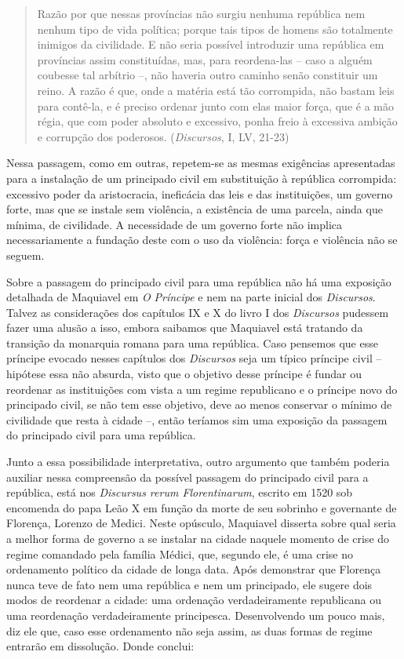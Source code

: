 \begin{quote}
Razão por que nessas províncias não surgiu nenhuma república nem nenhum
tipo de vida política; porque tais tipos de homens são totalmente
inimigos da civilidade. E não seria possível introduzir uma república em
províncias assim constituídas, mas, para reordena-las -- caso a alguém
coubesse tal arbítrio --, não haveria outro caminho senão constituir um
reino. A razão é que, onde a matéria está tão corrompida, não bastam
leis para contê-la, e é preciso ordenar junto com elas maior força, que
é a mão régia, que com poder absoluto e excessivo, ponha freio à
excessiva ambição e corrupção dos poderosos. (\emph{Discursos}, I, LV,
21-23)
\end{quote}

Nessa passagem, como em outras, repetem-se as mesmas exigências
apresentadas para a instalação de um principado civil em substituição à
república corrompida: excessivo poder da aristocracia, ineficácia das
leis e das instituições, um governo forte, mas que se instale sem
violência, a existência de uma parcela, ainda que mínima, de civilidade.
A necessidade de um governo forte não implica necessariamente a fundação
deste com o uso da violência: força e violência não se seguem.

Sobre a passagem do principado civil para uma república não há uma
exposição detalhada de Maquiavel em \emph{O} \emph{Príncipe} e nem na
parte inicial dos \emph{Discursos}. Talvez as considerações dos
capítulos IX e X do livro I dos \emph{Discursos} pudessem fazer uma
alusão a isso, embora saibamos que Maquiavel está tratando da transição
da monarquia romana para uma república. Caso pensemos que esse príncipe
evocado nesses capítulos dos \emph{Discursos} seja um típico príncipe
civil -- hipótese essa não absurda, visto que o objetivo desse príncipe
é fundar ou reordenar as instituições com vista a um regime republicano
e o príncipe novo do principado civil, se não tem esse objetivo, deve ao
menos conservar o mínimo de civilidade que resta à cidade --, então
teríamos sim uma exposição da passagem do principado civil para uma
república.

Junto a essa possibilidade interpretativa, outro argumento que também
poderia auxiliar nessa compreensão da possível passagem do principado
civil para a república, está nos \emph{Discursus rerum Florentinarum},
escrito em 1520 sob encomenda do papa Leão X em função da morte de seu
sobrinho e governante de Florença, Lorenzo de Medici. Neste opúsculo,
Maquiavel disserta sobre qual seria a melhor forma de governo a se
instalar na cidade naquele momento de crise do regime comandado pela
família Médici, que, segundo ele, é uma crise no ordenamento político da
cidade de longa data. Após demonstrar que Florença nunca teve de fato
nem uma república e nem um principado, ele sugere dois modos de
reordenar a cidade: uma ordenação verdadeiramente republicana ou uma
reordenação verdadeiramente principesca. Desenvolvendo um pouco mais,
diz ele que, caso esse ordenamento não seja assim, as duas formas de
regime entrarão em dissolução. Donde conclui:

